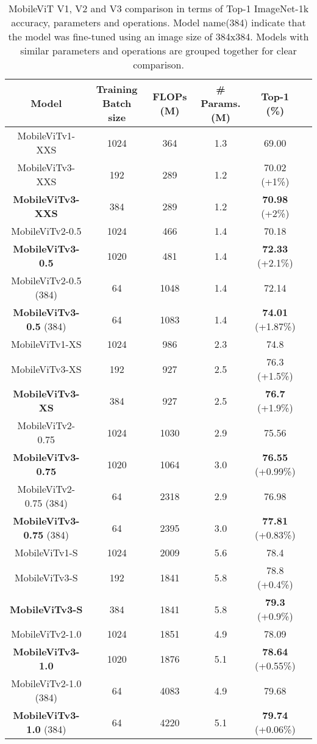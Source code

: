 \documentclass{article} \usepackage{iclr2022_conference,times}
\begin{document}
\begin{table}[!thb]
\scriptsize
\centering
\begin{tabular}{cccccc} \toprule
    {Model} & {Training Batch size} & {FLOPs (M)} & {\# Params. (M)} & {Top-1 (\%)} \\ 
    \midrule
    MobileViTv1-XXS  & 1024  & 364 & 1.3 & 69.00 \\
    MobileViTv3-XXS  & 192  & 289  & 1.2 & 70.02 (+1\%)\\
    \textbf{MobileViTv3-XXS}  & 384  & 289  & 1.2 & \textbf{70.98} (+2\%)  \\
    \midrule
    MobileViTv2-0.5  & 1024  & 466 & 1.4 & 70.18 \\
    \textbf{MobileViTv3-0.5}  & 1020  & 481  & 1.4 & \textbf{72.33} (+2.1\%)\\
    \midrule
    MobileViTv2-0.5 (384)  & 64  & 1048 & 1.4 & 72.14 \\
    \textbf{MobileViTv3-0.5} (384)  & 64  & 1083  & 1.4 & \textbf{74.01} (+1.87\%)\\
 \midrule
    MobileViTv1-XS  & 1024  & 986 & 2.3 & 74.8 \\
    MobileViTv3-XS  & 192  & 927  & 2.5 & 76.3 (+1.5\%)  \\
    \textbf{MobileViTv3-XS}  & 384  & 927  & 2.5 & \textbf{76.7} (+1.9\%)  \\
    \midrule
    MobileViTv2-0.75  & 1024  & 1030 & 2.9 & 75.56 \\
    \textbf{MobileViTv3-0.75}  & 1020  & 1064  & 3.0 & \textbf{76.55} (+0.99\%)\\
    \midrule
    MobileViTv2-0.75 (384)  & 64  & 2318 & 2.9 & 76.98 \\
    \textbf{MobileViTv3-0.75} (384)  & 64  & 2395  & 3.0 & \textbf{77.81} (+0.83\%)\\
 \midrule
    MobileViTv1-S  & 1024  & 2009 & 5.6 & 78.4 \\
    MobileViTv3-S  & 192  & 1841  & 5.8 & 78.8 (+0.4\%)  \\ 
    \textbf{MobileViTv3-S}  & 384  & 1841  & 5.8 & \textbf{79.3} (+0.9\%)  \\ 
    \midrule
    MobileViTv2-1.0  & 1024  & 1851 & 4.9 & 78.09 \\
    \textbf{MobileViTv3-1.0}  & 1020  & 1876  & 5.1 & \textbf{78.64} (+0.55\%)\\
    \midrule
    MobileViTv2-1.0 (384)  & 64  & 4083 & 4.9 & 79.68 \\
    \textbf{MobileViTv3-1.0} (384)  & 64  & 4220  & 5.1 & \textbf{79.74} (+0.06\%)\\
    \bottomrule
\end{tabular}
\caption{MobileViT V1, V2 and V3 comparison in terms of Top-1 ImageNet-1k accuracy, parameters and operations. Model name(384) indicate that the model was fine-tuned using an image size of 384x384. Models with similar parameters and operations are grouped together for clear comparison.}
\label{table:comp_batch}
\end{table}
\end{document}
